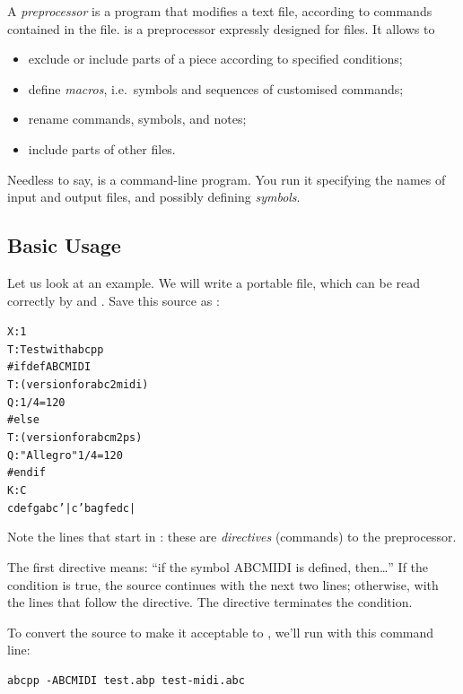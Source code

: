 \documentclass[a4paper,12pt]{book}
\begin{document}
\lettrine{A}{} \emph{preprocessor} is a program that modifies a text
file, according to commands contained in the file. \abcpp{} is a
preprocessor expressly designed for \ABC{} files. It allows to

\begin{itemize}
  
  \item exclude or include parts of a piece according to specified
  conditions;
  
  \item define \emph{macros}, i.e.\ symbols and sequences of customised
  commands;
  
  \item rename commands, symbols, and notes;
  
  \item include parts of other files.
  
\end{itemize}

Needless to say, \abcpp{} is a command-line program. You run it specifying
the names of input and output files, and possibly defining \emph{symbols}.


\subsection{Basic Usage}

Let us look at an example. We will write a portable \ABC{} file, which
can be read correctly by \abcm{} and \abcmid. Save this source as
:

\begin{alltt}
X: 1
T: Test with abcpp
#ifdef ABCMIDI
T: (version for abc2midi)
Q: 1/4 = 120
#else
T: (version for abcm2ps)
Q: "Allegro" 1/4 = 120
#endif
K: C
cdef gabc'|c'bag fedc|
\end{alltt}

Note the lines that start in \car{\#}: these are \emph{directives}
(commands) to the preprocessor.

The first directive means: ``if the symbol ABCMIDI is defined,
then{\ldots}'' If the condition is true, the source continues with the next
two lines; otherwise, with the lines that follow the  directive.
The  directive terminates the condition.

To convert the source to make it acceptable to \abcmid, we'll run \abcpp{}
with this command line:

\begin{verbatim}
abcpp -ABCMIDI test.abp test-midi.abc
\end{verbatim}
\end{document}
